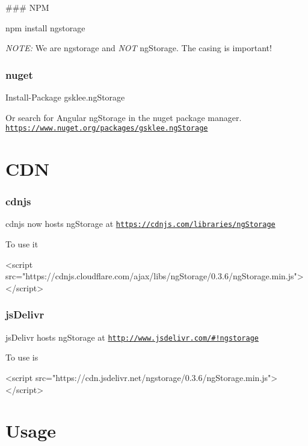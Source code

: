 \#\#\# N\+PM 
\begin{DoxyCode}
npm install ngstorage
\end{DoxyCode}


{\itshape N\+O\+TE\+:} We are {\ttfamily ngstorage} and {\itshape N\+OT} {\ttfamily ng\+Storage}. The casing is important!

\subsubsection*{nuget}


\begin{DoxyCode}
Install-Package gsklee.ngStorage
\end{DoxyCode}


Or search for {\ttfamily Angular ng\+Storage} in the nuget package manager. \href{https://www.nuget.org/packages/gsklee.ngStorage}{\tt https\+://www.\+nuget.\+org/packages/gsklee.\+ng\+Storage}

\section*{C\+DN }

\subsubsection*{cdnjs}

cdnjs now hosts ng\+Storage at \href{https://cdnjs.com/libraries/ngStorage}{\tt https\+://cdnjs.\+com/libraries/ng\+Storage}

To use it


\begin{DoxyCode}
<script src="https://cdnjs.cloudflare.com/ajax/libs/ngStorage/0.3.6/ngStorage.min.js"></script>
\end{DoxyCode}


\subsubsection*{js\+Delivr}

js\+Delivr hosts ng\+Storage at \href{http://www.jsdelivr.com/#!ngstorage}{\tt http\+://www.\+jsdelivr.\+com/\#!ngstorage}

To use is


\begin{DoxyCode}
<script src="https://cdn.jsdelivr.net/ngstorage/0.3.6/ngStorage.min.js"></script>
\end{DoxyCode}


\section*{Usage }

